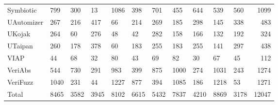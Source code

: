 \documentclass[notitlepage]{article}
\begin{document}
\begin{tabular}{lllllllllllr}
Symbiotic       &        799 &   300 &         13 &  1086 &     398 &   701 &         455 &   644 &    539 &   560 &   1099 \\
UAutomizer      &        267 &   216 &        417 &    66 &     214 &   269 &         185 &   298 &    145 &   338 &    483 \\
UKojak          &        264 &    60 &        276 &    48 &      42 &   282 &         158 &   166 &    132 &   192 &    324 \\
UTaipan         &        260 &   178 &        378 &    60 &     183 &   255 &         183 &   255 &    141 &   297 &    438 \\
VIAP            &         44 &    68 &         32 &    80 &      43 &    69 &          82 &    30 &     67 &    45 &    112 \\
VeriAbs         &        544 &   730 &        291 &   983 &     399 &   875 &        1000 &   274 &   1031 &   243 &   1274 \\
VeriFuzz        &       1040 &   231 &         44 &  1227 &     877 &   394 &        1085 &   186 &   1218 &    53 &   1271 \\
Total           &       8465 &  3582 &       3945 &  8102 &    6615 &  5432 &        7837 &  4210 &   8869 &  3178 &  12047 \\
\bottomrule
\end{tabular}
\end{document}

